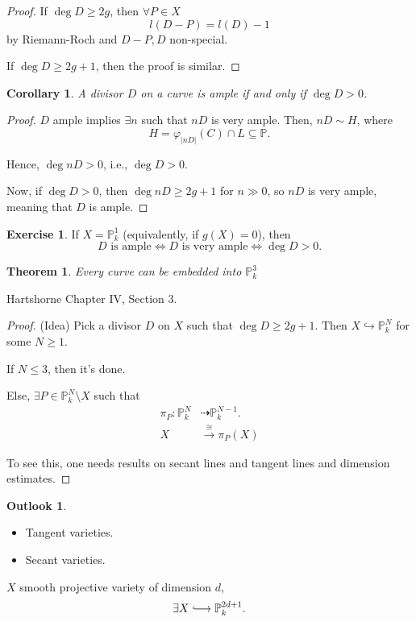 \documentclass[12pt]{article}
\newtheorem*{theorem}{Theorem}
\newtheorem*{corollary}{Corollary}
\theoremstyle{definition}
\newtheorem*{exercise}{Exercise}
\newtheorem*{outlook}{Outlook}
\theoremstyle{remark}
\begin{document}
\begin{proof}
If $\deg D\geq2g$, then $\forall P\in X$
\[l(D-P)=l(D)-1\]
by Riemann-Roch and $D-P,D$ non-special.

If $\deg D\geq2g+1$, then the proof is similar.
\end{proof}

\begin{corollary}
A divisor $D$ on a curve is ample if and only if $\deg D>0$.
\end{corollary}

\begin{proof}
$D$ ample implies $\exists n$ such that $nD$ is very ample. Then, $nD\sim H$, where
\[H=\varphi_{|nD|}(C)\cap L\subseteq\mathbb{P}.\]

Hence, $\deg nD>0$, i.e., $\deg D>0$.

Now, if $\deg D>0$, then $\deg nD\geq2g+1$ for $n\gg0$, so $nD$ is very ample, meaning that $D$ is ample.
\end{proof}

\begin{exercise}
If $X=\mathbb{P}_k^1$ (equivalently, if $g(X)=0$), then
\[D\text{ is ample}\Longleftrightarrow D\text{ is very ample}\Longleftrightarrow\deg D>0.\]
\end{exercise}

\begin{theorem}
Every curve can be embedded into $\mathbb{P}_k^3$
\end{theorem}

Hartshorne \cite{hartshorne2013algebraic} Chapter IV, Section 3.

\begin{proof}
(Idea) Pick a divisor $D$ on $X$ such that $\deg D\geq2g+1$. Then $X\hookrightarrow\mathbb{P}_k^N$ for some $N\geq1$.

If $N\leq3$, then it's done.

Else, $\exists P\in\mathbb{P}_k^N\setminus X$ such that
\begin{align*}\tag{Projection away from $P$}
\pi_P:\mathbb{P}_k^N&\dashrightarrow\mathbb{P}_k^{N-1}.\\
X&\overset{\cong}{\longrightarrow}\pi_P(X)
\end{align*}

To see this, one needs results on secant lines and tangent lines and dimension estimates.
\end{proof}

\begin{outlook}
\begin{itemize}[label=$-$]
\item Tangent varieties.
\item Secant varieties.
\end{itemize}

$X$ smooth projective variety of dimension $d$,
\[\exists X\lhook\joinrel\longrightarrow\mathbb{P}_k^{2d+1}.\]
\end{outlook}
\end{document}
